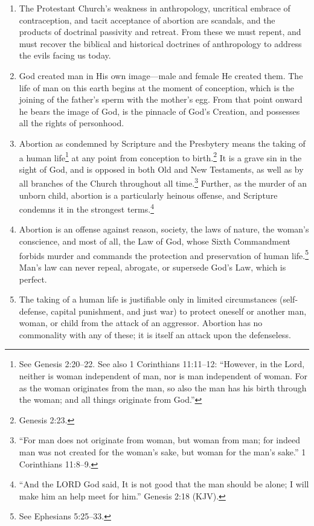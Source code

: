 \documentclass[
]{book}
\begin{document}
\begin{enumerate}
\def\labelenumi{\arabic{enumi}.}
\item
  The Protestant Church's weakness in anthropology, uncritical embrace of contraception, and tacit acceptance of abortion are scandals, and the products of doctrinal passivity and retreat. From these we must repent, and must recover the biblical and historical doctrines of anthropology to address the evils facing us today.
\item
  God created man in His own image---male and female He created them. The life of man on this earth begins at the moment of conception, which is the joining of the father's sperm with the mother's egg. From that point onward he bears the image of God, is the pinnacle of God's Creation, and possesses all the rights of personhood.
\item
  Abortion as condemned by Scripture and the Presbytery means the taking of a human life\footnote{See Genesis 2:20--22. See also 1 Corinthians 11:11--12: ``However, in the Lord, neither is woman independent of man, nor is man independent of woman. For as the woman originates from the man, so also the man has his birth through the woman; and all things originate from God.''} at any point from conception to birth.\footnote{Genesis 2:23.} It is a grave sin in the sight of God, and is opposed in both Old and New Testaments, as well as by all branches of the Church throughout all time.\footnote{``For man does not originate from woman, but woman from man; for indeed man was not created for the woman's sake, but woman for the man's sake.'' 1 Corinthians 11:8--9.} Further, as the murder of an unborn child, abortion is a particularly heinous offense, and Scripture condemns it in the strongest terms.\footnote{``And the LORD God said, It is not good that the man should be alone; I will make him an help meet for him.'' Genesis 2:18 (KJV).}
\item
  Abortion is an offense against reason, society, the laws of nature, the woman's conscience, and most of all, the Law of God, whose Sixth Commandment forbids murder and commands the protection and preservation of human life.\footnote{See Ephesians 5:25--33.} Man's law can never repeal, abrogate, or supersede God's Law, which is perfect.
\item
  The taking of a human life is justifiable only in limited circumstances (self-defense, capital punishment, and just war) to protect oneself or another man, woman, or child from the attack of an aggressor. Abortion has no commonality with any of these; it is itself an attack upon the defenseless.

\end{enumerate}
\end{document}
